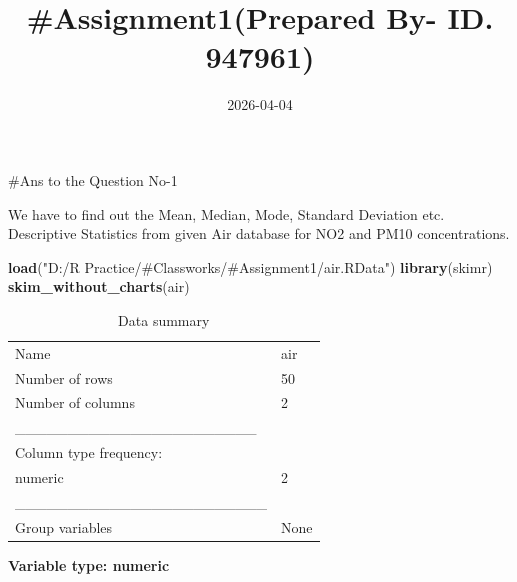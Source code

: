 \documentclass[
]{article}
\title{\#Assignment1(Prepared By- ID. 947961)}
\author{}
\date{\vspace{-2.5em}2026-04-04}
\newenvironment{Shaded}{\begin{snugshade}}{\end{snugshade}}
\newcommand{\FunctionTok}[1]{\textcolor[rgb]{0.13,0.29,0.53}{\textbf{#1}}}
\newcommand{\NormalTok}[1]{#1}
\newcommand{\StringTok}[1]{\textcolor[rgb]{0.31,0.60,0.02}{#1}}
\begin{document}
\maketitle

\#Ans to the Question No-1

We have to find out the Mean, Median, Mode, Standard Deviation etc.
Descriptive Statistics from given Air database for NO2 and PM10
concentrations.

\begin{Shaded}
\begin{Highlighting}[]
\FunctionTok{load}\NormalTok{(}\StringTok{"D:/R Practice/\#Classworks/\#Assignment1/air.RData"}\NormalTok{)}
\FunctionTok{library}\NormalTok{(skimr)}
\FunctionTok{skim\_without\_charts}\NormalTok{(air)}
\end{Highlighting}
\end{Shaded}

\begin{longtable}[]{@{}ll@{}}
\caption{Data summary}\tabularnewline
\toprule\noalign{}
\endfirsthead
\endhead
\bottomrule\noalign{}
\endlastfoot
Name & air \\
Number of rows & 50 \\
Number of columns & 2 \\
\_\_\_\_\_\_\_\_\_\_\_\_\_\_\_\_\_\_\_\_\_\_\_ & \\
Column type frequency: & \\
numeric & 2 \\
\_\_\_\_\_\_\_\_\_\_\_\_\_\_\_\_\_\_\_\_\_\_\_\_ & \\
Group variables & None \\
\end{longtable}

\textbf{Variable type: numeric}
\end{document}
